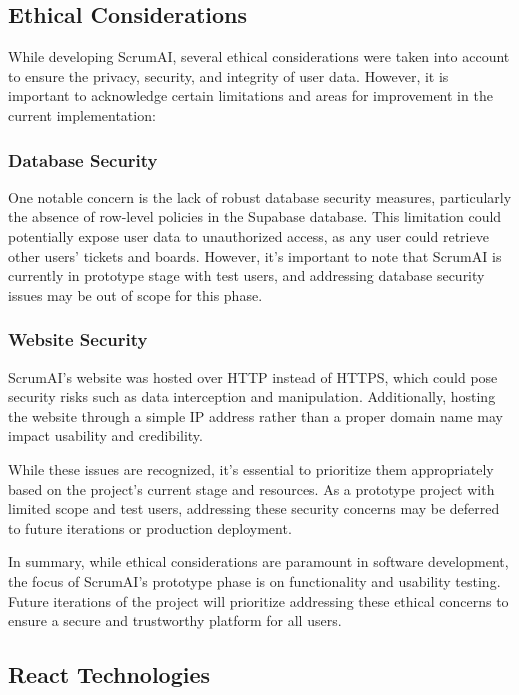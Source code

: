 \documentclass[conference]{IEEEtran}
\begin{document}
\subsection{Ethical Considerations}
While developing ScrumAI, several ethical considerations were taken into account to ensure the privacy, security, and integrity of user data. However, it is important to acknowledge certain limitations and areas for improvement in the current implementation:

\subsubsection{Database Security}
One notable concern is the lack of robust database security measures, particularly the absence of row-level policies in the Supabase database. This limitation could potentially expose user data to unauthorized access, as any user could retrieve other users' tickets and boards. However, it's important to note that ScrumAI is currently in prototype stage with test users, and addressing database security issues may be out of scope for this phase.

\subsubsection{Website Security}
ScrumAI's website was hosted over HTTP instead of HTTPS, which could pose security risks such as data interception and manipulation. Additionally, hosting the website through a simple IP address rather than a proper domain name may impact usability and credibility.

While these issues are recognized, it's essential to prioritize them appropriately based on the project's current stage and resources. As a prototype project with limited scope and test users, addressing these security concerns may be deferred to future iterations or production deployment.

In summary, while ethical considerations are paramount in software development, the focus of ScrumAI's prototype phase is on functionality and usability testing. Future iterations of the project will prioritize addressing these ethical concerns to ensure a secure and trustworthy platform for all users.

\subsection{React Technologies}
\end{document}
